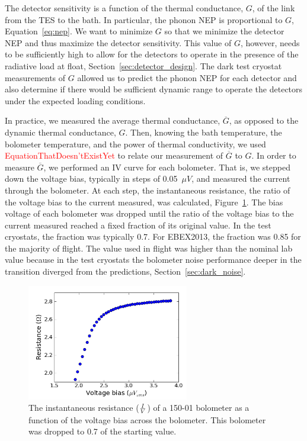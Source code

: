The detector sensitivity is a function of the thermal conductance, $G$, of the link from the TES to the bath. %
In particular, the phonon \ac{NEP} is proportional to $G$, Equation~\ref{eq:nep}. 
We want to minimize $G$ so that we minimize the detector \ac{NEP} and thus maximize the detector sensitivity. 
This value of $G$, however, needs to be sufficiently high to allow for the detectors to operate in the presence of the radiative load at float, Section~\ref{sec:detector_design}. 
The dark test cryostat measurements of $G$ allowed us to predict the phonon \ac{NEP} for each detector and also determine if there would be sufficient dynamic range to operate the detectors under the expected loading conditions. 

In practice, we measured the average thermal conductance, $\overline G$, as opposed to the dynamic thermal conductance, $G$.
Then, knowing the bath temperature, the bolometer temperature, and the power of thermal conductivity, we used \textcolor{red}{EquationThatDoesn'tExistYet} to relate our measurement of $\overline G$ to $G$. 
In order to measure $\overline G$, we performed an IV curve for each bolometer.
That is, we stepped down the voltage bias, typically in steps of 0.05~$\mu V$, and measured the current through the bolometer. 
At each step, the instantaneous resistance, the ratio of the voltage bias to the current measured, was calculated, Figure~\ref{fig:bolo_rv_curve}. 
The bias voltage of each bolometer was dropped until the ratio of the voltage bias to the current measured reached a fixed fraction of its original value.
In the test cryostats, the fraction was typically 0.7. 
For \ac{EBEX2013}, the fraction was 0.85 for the majority of flight.
The value used in flight was higher than the nominal lab value because in the test cryostats the bolometer noise performance deeper in the transition diverged from the predictions, Section~\ref{sec:dark_noise}. 

\begin{figure}[htbp]
\begin{center}
\includegraphics[height=2in]{figures/RV_201007301208.png} 
\caption{The instantaneous resistance ($I \over V$) of a 150-01 bolometer as a function of the voltage bias across the bolometer. This bolometer was dropped to 0.7 of the starting value. 
\label{fig:bolo_rv_curve} }
\end{center}
\end{figure}


